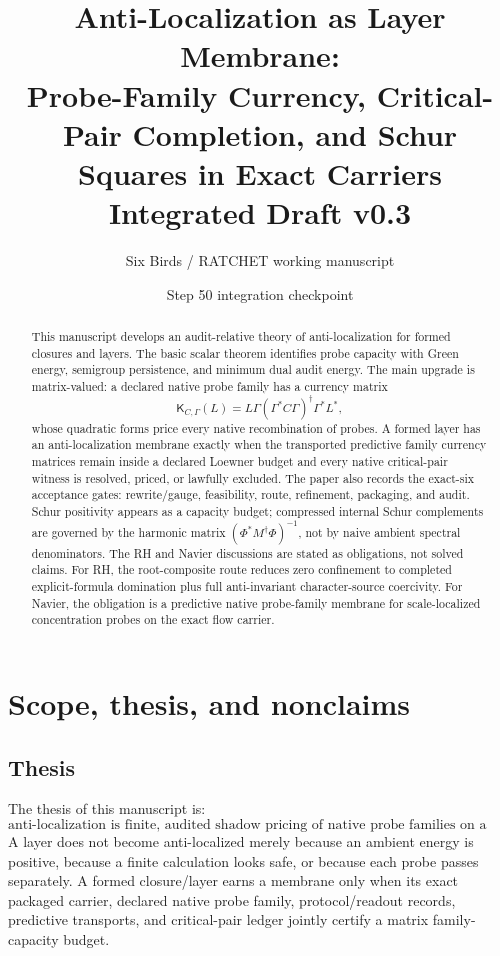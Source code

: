 \documentclass[11pt]{article}
\title{Anti-Localization as Layer Membrane:\\
Probe-Family Currency, Critical-Pair Completion, and Schur Squares in Exact Carriers\\
\large Integrated Draft v0.3}
\author{Six Birds / RATCHET working manuscript}
\date{Step 50 integration checkpoint}
\newcommand{\K}{\mathsf K}
\begin{document}
\maketitle

\begin{abstract}
This manuscript develops an audit-relative theory of anti-localization for formed closures and layers.  The basic scalar theorem identifies probe capacity with Green energy, semigroup persistence, and minimum dual audit energy.  The main upgrade is matrix-valued: a declared native probe family has a currency matrix
\[
  \K_{C,\Gamma}(L)=L\Gamma(\Gamma^*C\Gamma)^\dagger\Gamma^*L^*,
\]
whose quadratic forms price every native recombination of probes.  A formed layer has an anti-localization membrane exactly when the transported predictive family currency matrices remain inside a declared Loewner budget and every native critical-pair witness is resolved, priced, or lawfully excluded.  The paper also records the exact-six acceptance gates: rewrite/gauge, feasibility, route, refinement, packaging, and audit.  Schur positivity appears as a capacity budget; compressed internal Schur complements are governed by the harmonic matrix \((\Phi^*M^\dagger\Phi)^{-1}\), not by naive ambient spectral denominators.  The RH and Navier discussions are stated as obligations, not solved claims.  For RH, the root-composite route reduces zero confinement to completed explicit-formula domination plus full anti-invariant character-source coercivity.  For Navier, the obligation is a predictive native probe-family membrane for scale-localized concentration probes on the exact flow carrier.
\end{abstract}

\tableofcontents

\section{Scope, thesis, and nonclaims}

\subsection{Thesis}
The thesis of this manuscript is:
\[
\boxed{\text{anti-localization is finite, audited shadow pricing of native probe families on a formed layer.}}
\]
A layer does not become anti-localized merely because an ambient energy is positive, because a finite calculation looks safe, or because each probe passes separately.  A formed closure/layer earns a membrane only when its exact packaged carrier, declared native probe family, protocol/readout records, predictive transports, and critical-pair ledger jointly certify a matrix family-capacity budget.
\end{document}
